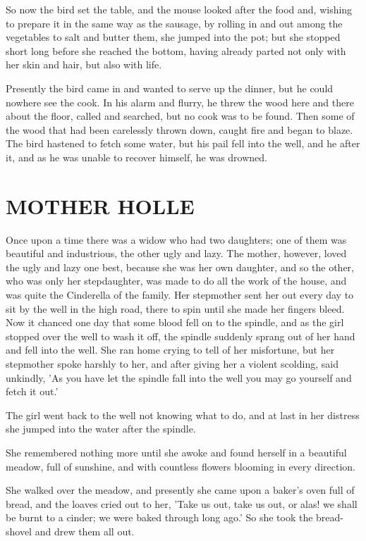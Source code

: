 \documentclass[12pt]{book}
\begin{document}
So now the bird set the table, and the mouse looked after the food
and, wishing to prepare it in the same way as the sausage, by rolling
in and out among the vegetables to salt and butter them, she jumped
into the pot; but she stopped short long before she reached the
bottom, having already parted not only with her skin and hair, but
also with life.

Presently the bird came in and wanted to serve up the dinner, but he
could nowhere see the cook. In his alarm and flurry, he threw the wood
here and there about the floor, called and searched, but no cook was
to be found. Then some of the wood that had been carelessly thrown
down, caught fire and began to blaze. The bird hastened to fetch some
water, but his pail fell into the well, and he after it, and as he was
unable to recover himself, he was drowned.



\chapter{MOTHER HOLLE}

Once upon a time there was a widow who had two daughters; one of them
was beautiful and industrious, the other ugly and lazy. The mother,
however, loved the ugly and lazy one best, because she was her own
daughter, and so the other, who was only her stepdaughter, was made to
do all the work of the house, and was quite the Cinderella of the
family. Her stepmother sent her out every day to sit by the well in
the high road, there to spin until she made her fingers bleed. Now it
chanced one day that some blood fell on to the spindle, and as the
girl stopped over the well to wash it off, the spindle suddenly sprang
out of her hand and fell into the well. She ran home crying to tell of
her misfortune, but her stepmother spoke harshly to her, and after
giving her a violent scolding, said unkindly, 'As you have let the
spindle fall into the well you may go yourself and fetch it out.'

The girl went back to the well not knowing what to do, and at last in
her distress she jumped into the water after the spindle.

She remembered nothing more until she awoke and found herself in a
beautiful meadow, full of sunshine, and with countless flowers
blooming in every direction.

She walked over the meadow, and presently she came upon a baker's oven
full of bread, and the loaves cried out to her, 'Take us out, take us
out, or alas! we shall be burnt to a cinder; we were baked through
long ago.' So she took the bread-shovel and drew them all out.
\end{document}
